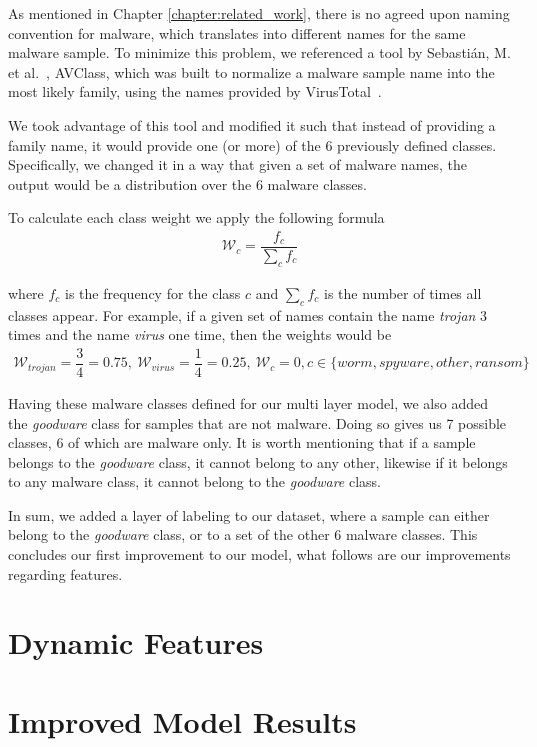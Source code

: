 As mentioned in Chapter \ref{chapter:related_work}, there is no agreed upon naming convention for malware, which translates into different names for the same malware sample.
To minimize this problem, we referenced a tool by Sebastián, M. et al.~\cite{sebastian2016avclass}, AVClass, which was built to normalize a malware sample name into the most likely family, using the names provided by VirusTotal~\cite{tool:virustotal}.

We took advantage of this tool and modified it such that instead of providing a family name, it would provide one (or more) of the 6 previously defined classes.
Specifically, we changed it in a way that given a set of malware names, the output would be a distribution over the 6 malware classes.

To calculate each class weight we apply the following formula
\begin{eqnarray*}
	\mathcal{W}_c = \dfrac{f_c}{\sum\limits_{c}f_c}
\end{eqnarray*}

where $f_c$ is the frequency for the class $c$ and $\sum_{c}f_c$ is the number of times all classes appear.
For example, if a given set of names contain the name \textit{trojan} 3 times and the name \textit{virus} one time, then the weights would be
\begin{eqnarray*}
	\mathcal{W}_{trojan}=\dfrac{3}{4}=0.75,~\mathcal{W}_{virus}=\dfrac{1}{4}=0.25,~ \mathcal{W}_{c}=0, c \in \{worm, spyware, other, ransom\}
\end{eqnarray*}

\medskip

Having these malware classes defined for our multi layer model, we also added the \textit{goodware} class for samples that are not malware.
Doing so gives us 7 possible classes, 6 of which are malware only.
It is worth mentioning that if a sample belongs to the \textit{goodware} class, it cannot belong to any other, likewise if it belongs to any malware class, it cannot belong to the \textit{goodware} class.

In sum, we added a layer of labeling to our dataset, where a sample can either belong to the \textit{goodware} class, or to a set of the other 6 malware classes.
This concludes our first improvement to our model, what follows are our improvements regarding features.

\section{Dynamic Features}
\label{section:improvements_dynamic_features}

\section{Improved Model Results}
\label{section:improvements_results}